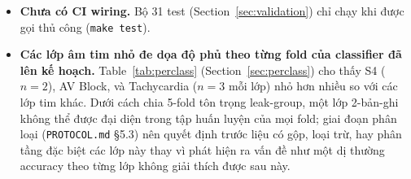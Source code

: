 \documentclass[11pt]{article}
\begin{document}
\begin{itemize}
    sang landscape) trước bất kỳ lần nộp hoàn thiện nào.
  \item \textbf{Chưa có CI wiring.} Bộ 31 test (Section~\ref{sec:validation})
    chỉ chạy khi được gọi thủ công (\texttt{make test}).
  \item \textbf{Các lớp âm tim nhỏ đe dọa độ phủ theo từng fold của
    classifier đã lên kế hoạch.} Table~\ref{tab:perclass}
    (Section~\ref{sec:perclass}) cho thấy S4 ($n{=}2$), AV Block, và
    Tachycardia ($n{=}3$ mỗi lớp) nhỏ hơn nhiều so với các lớp tim khác.
    Dưới cách chia 5-fold tôn trọng leak-group, một lớp 2-bản-ghi không
    thể được đại diện trong tập huấn luyện của mọi fold; giai đoạn phân
    loại (\texttt{PROTOCOL.md} \S5.3) nên quyết định trước liệu có gộp,
    loại trừ, hay phân tầng đặc biệt các lớp này thay vì phát hiện ra
    vấn đề như một dị thường accuracy theo từng lớp không giải thích
    được sau này.
\end{itemize}
\end{document}
